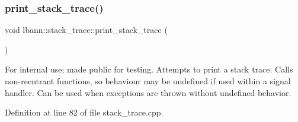 \mbox{\label{namespacelbann_1_1stack__trace_a52adbb11fce7541e2bc34b712d09e868}} 
\subsubsection{\texorpdfstring{print\+\_\+stack\+\_\+trace()}{print\_stack\_trace()}}
{\footnotesize\ttfamily void lbann\+::stack\+\_\+trace\+::print\+\_\+stack\+\_\+trace (\begin{DoxyParamCaption}{ }\end{DoxyParamCaption})}

For internal use; made public for testing. Attempts to print a stack trace. Calls non-\/reentrant functions, so behaviour may be undefined if used within a signal handler. Can be used when exceptions are thrown without undefined behavior. 

Definition at line 82 of file stack\+\_\+trace.\+cpp.


